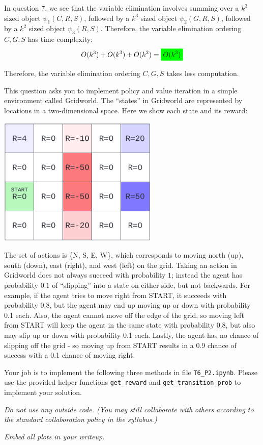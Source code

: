 \documentclass[submit]{harvardml}
\newcommand{\mathcolorbox}[2]{\colorbox{#1}{$\displaystyle #2$}}
\begin{document}
In question 7, we see that the variable elimination involves summing over a $k^3$ sized object $\psi_1(C,R,S)$, followed by a $k^3$ sized object $\psi_2(G,R,S)$, followed by a $k^2$ sized object $\psi_3(R,S)$. Therefore, the variable elimination ordering $C,G,S$ has time complexity:
$$O(k^3)+O(k^3)+O(k^2) = \mathcolorbox{green}{O(k^3)}$$

Therefore, the variable elimination ordering $C,G,S$ takes less computation.

\newpage


\begin{problem}

This question asks you to implement policy and value iteration in a
simple environment called Gridworld.  The ``states'' in Gridworld are
represented by locations in a two-dimensional space.  Here we show each state and its reward:

\begin{center}
\includegraphics[width=3in]{gridworld.png}
\end{center}
The set of actions is \{N, S, E, W\}, which corresponds to moving north (up), south (down), east (right), and west (left) on the grid.
Taking an action in Gridworld does not always succeed with probability
$1$; instead the agent has probability $0.1$ of ``slipping'' into a
state on either side, but not backwards.  For example, if the agent tries to move right from START, it succeeds with probability 0.8, but the agent may end up moving up or down with probability 0.1 each. Also, the agent cannot move off the edge of the grid, so moving left from START will keep the agent in the same state with probability 0.8, but also may slip up or down with probability 0.1 each. Lastly, the agent has no chance of slipping off the grid - so moving up from START results in a 0.9 chance of success with a 0.1 chance of moving right.

Your job is to implement the following three methods in file \texttt{T6\_P2.ipynb}. Please use the provided helper functions \texttt{get\_reward} and \texttt{get\_transition\_prob} to implement your solution.

\emph{Do not use any outside code.  (You may still collaborate with others according to the standard collaboration policy in the syllabus.)}  

\emph{Embed all plots in your writeup.}
\end{problem}
\newpage
\end{document}
